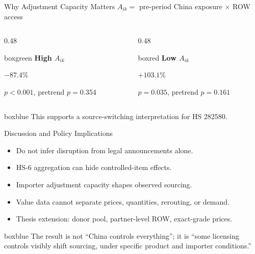 \documentclass[aspectratio=169,11pt]{beamer}
\begin{document}
\begin{frame}{Why Adjustment Capacity Matters}
  \large
  \(A_{ik}=\) pre-period China exposure \(\times\) ROW access

  \vspace{0.35cm}
  \begin{columns}[T,totalwidth=\textwidth]
    \begin{column}{0.48\textwidth}
      \begin{beamercolorbox}[sep=1.0em,wd=\textwidth]{boxgreen}
        \large\textbf{High \(A_{ik}\)}
        \vspace{0.25cm}

        {\Huge \(-87.4\%\)}

        \vspace{0.15cm}
        \normalsize \(p<0.001\), pretrend \(p=0.354\)
      \end{beamercolorbox}
    \end{column}
    \begin{column}{0.48\textwidth}
      \begin{beamercolorbox}[sep=1.0em,wd=\textwidth]{boxred}
        \large\textbf{Low \(A_{ik}\)}
        \vspace{0.25cm}

        {\Huge \(+103.1\%\)}

        \vspace{0.15cm}
        \normalsize \(p=0.035\), pretrend \(p=0.161\)
      \end{beamercolorbox}
    \end{column}
  \end{columns}

  \vfill
  \begin{beamercolorbox}[sep=0.7em,wd=\textwidth]{boxblue}
    \large This supports a source-switching interpretation for HS 282580.
  \end{beamercolorbox}
\end{frame}

\begin{frame}{Discussion and Policy Implications}
  \large
  \begin{itemize}
    \item Do not infer disruption from legal announcements alone.
    \item HS-6 aggregation can hide controlled-item effects.
    \item Importer adjustment capacity shapes observed sourcing.
    \item Value data cannot separate prices, quantities, rerouting, or demand.
    \item Thesis extension: donor pool, partner-level ROW, exact-grade prices.
  \end{itemize}

  \vfill
  \begin{beamercolorbox}[sep=0.9em,wd=\textwidth]{boxblue}
    \Large The result is not ``China controls everything''; it is ``some licensing controls visibly shift sourcing, under specific product and importer conditions.''
  \end{beamercolorbox}
\end{frame}
\end{document}
